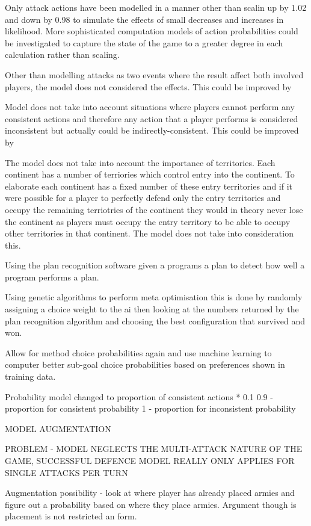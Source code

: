 \documentclass[parskip]{cs4rep}
\begin{document}
Only attack actions have been modelled in a manner other than scalin up by 1.02 and down by 0.98 to simulate the effects of small decreases and increases in likelihood. More sophisticated computation models of action probabilities could be investigated to capture the state of the game to a greater degree in each calculation rather than scaling.

Other than modelling attacks as two events where the result affect both involved players, the model does not considered the effects. This could be improved by

Model does not take into account situations where players cannot perform any consistent actions and therefore any action that a player performs is considered inconsistent but actually could be indirectly-consistent. This could be improved by

The model does not take into account the importance of territories. Each continent has a number of terriories which control entry into the continent. To elaborate each continent has a fixed number of these entry territories and if it were possible for a player to perfectly defend only the entry territories and occupy the remaining terriotries of the continent they would in theory never lose the continent as players must occupy the entry territory to be able to occupy other territories in that continent. The model does not take into consideration this.

Using the plan recognition software given a programs a plan to detect how well a program performs a plan. 

Using genetic algorithms to perform meta optimisation this is done by randomly assigning a choice weight to the ai then looking at the numbers returned by the plan recognition algorithm and choosing the best configuration that survived and won.

Allow for method choice probabilities again and use machine learning to computer better sub-goal choice probabilities based on preferences shown in training data.

Probability model changed to proportion of consistent actions * 0.1 
0.9 - proportion for consistent probability
1 - proportion for inconsistent probability

MODEL AUGMENTATION

PROBLEM - MODEL NEGLECTS THE MULTI-ATTACK NATURE OF THE GAME, SUCCESSFUL DEFENCE MODEL REALLY ONLY APPLIES FOR SINGLE ATTACKS PER TURN

Augmentation possibility - look at where player has already placed armies and figure out a probability based on where they place armies. Argument though is placement is not restricted an form.
\end{document}
